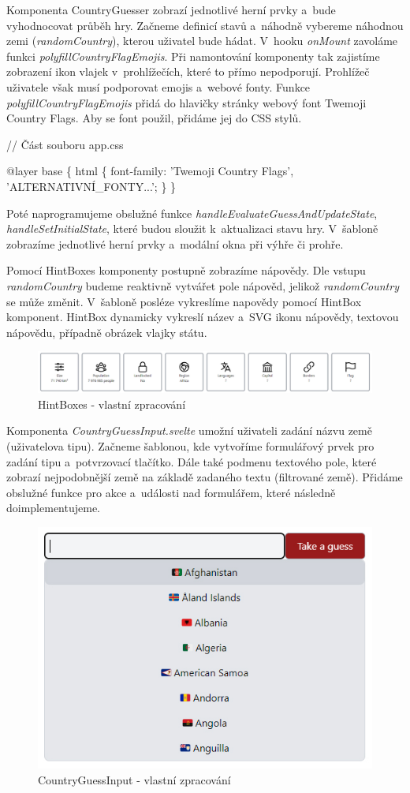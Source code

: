 Komponenta CountryGuesser zobrazí jednotlivé herní prvky a~bude vyhodnocovat průběh hry. 
Začneme definicí stavů a~náhodně vybereme náhodnou zemi (\emph{randomCountry}), kterou uživatel bude hádat. 
V~hooku \emph{onMount} zavoláme funkci \emph{polyfillCountryFlagEmojis}. Při namontování komponenty tak zajistíme zobrazení ikon vlajek v~prohlížečích, které to přímo nepodporují. 
Prohlížeč uživatele však musí podporovat emojis a~webové fonty. Funkce \emph{polyfillCountryFlagEmojis} přidá do hlavičky stránky webový font Twemoji Country Flags. 
Aby se font použil, přidáme jej do CSS stylů.

\begin{prog}
// Část souboru app.css

@layer base \{
  html \{
    font-family: 'Twemoji Country Flags', 'ALTERNATIVNÍ_FONTY...';
  \}
\}
\end{prog}

Poté naprogramujeme obslužné funkce \emph{handleEvaluateGuessAndUpdateState}, \emph{handleSetInitialState}, které budou sloužit k~aktualizaci stavu hry. 
V~šabloně zobrazíme jednotlivé herní prvky a~modální okna při výhře či prohře.

Pomocí HintBoxes komponenty postupně zobrazíme nápovědy. Dle vstupu \emph{randomCountry} budeme reaktivně vytvářet pole nápověd, jelikož \emph{randomCountry} se může změnit. 
V~šabloně posléze vykreslíme napovědy pomocí HintBox komponent. HintBox dynamicky vykreslí název a~SVG ikonu nápovědy, textovou nápovědu, případně obrázek vlajky státu.

\begin{figure}[htb]
	\centering
		\includegraphics[width=.97\textwidth]{images/HintBoxes.jpg}
	\caption[HintBoxes]{HintBoxes - vlastní zpracování}
	\label{fig:sveltehintboxes}
\end{figure}

Komponenta \emph{CountryGuessInput.svelte} umožní uživateli zadání názvu země (uživatelova tipu). Začneme šablonou, kde vytvoříme formulářový prvek pro zadání tipu a~potvrzovací tlačítko. 
Dále také podmenu textového pole, které zobrazí nejpodobnější země na základě zadaného textu (filtrované země). Přidáme obslužné funkce pro akce a~události nad formulářem, které následně doimplementujeme.

\begin{figure}[htb]
	\centering
		\includegraphics[width=.5\textwidth]{images/CountryGuessInput.jpg}
	\caption[CountryGuessInput]{CountryGuessInput - vlastní zpracování}
	\label{fig:sveltecountryguessinput}
\end{figure}

